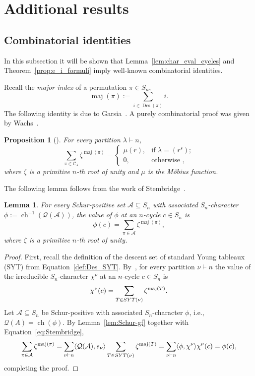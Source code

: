 \documentclass[10pt]{article}
\newtheorem{lemma}[theorem]{Lemma}
\newtheorem{proposition}[theorem]{Proposition}
\theoremstyle{definition}
\newcommand{\Q}{\mathcal Q}
\newcommand{\C}{\mathcal C}
\newcommand{\A}{\mathcal A}
\DeclareMathOperator\Des{Des}
\DeclareMathOperator\maj{maj}
\newcommand{\ch}{{\operatorname{ch}}}
\def\SYT{{\rm SYT}}
\begin{document}
\section{Additional results}
\label{sec:final}

\subsection{Combinatorial identities}
\label{remarks_on_s=1}

In this subsection it will be shown that Lemma~\ref{lem:char_eval_cycles} and Theorem~\ref{prop:e_i_formuli} imply well-known combinatorial identities.

Recall the {\em major index} of a permutation $\pi \in S_n$,
\[
    \maj(\pi):=\sum\limits_{i\in \Des(\pi)}i.
\]
The following identity is due to 
Garsia~\cite{Garsia}. A purely combinatorial proof was given by Wachs~\cite{Wachs}.

\begin{proposition}[{\cite[Equation 5.8]{Garsia}}]\label{prop:Garsia}
     For every partition $\lambda\vdash n$,
    \[
        \sum_{\pi \in \C_\lambda} \zeta^{\maj(\pi)}
        = \begin{cases} 
            \mu(r), &\text{if } \lambda = (r^s); \\
    		0, &\text{otherwise },
		\end{cases}
    \]
    where $\zeta$ is a primitive $n$-th root of unity and $\mu$ is the M\"obius function. 
\end{proposition}

The following lemma follows from the work of Stembridge~\cite{Stembridge}.

\begin{lemma}\label{prop:equiv_Garsia}
    For every Schur-positive set $\A\subseteq S_n$ with associated $S_n$-character $\phi := \ch^{-1}(\Q(\A))$, the value of $\phi$ at an $n$-cycle $c\in S_n$ is
    \[
        \phi(c) = \sum_{\pi \in \A} \zeta^{\maj(\pi)},
    \]
    where $\zeta$ is a primitive $n$-th root of unity. 
\end{lemma}

\begin{proof}
    First, recall 
    the definition of the descent set of standard Young tableaux (SYT) 
    from Equation~\eqref{def:Des_SYT}. By~\cite[Lemma 3.4]{Stembridge}, for every partition $\nu\vdash n$ the value of the irreducible $S_n$-character $\chi^\nu$ at an $n$-cycle $c\in S_n$ is 
    \begin{equation}\label{eq:Stembridge}
        \chi^\nu(c)=\sum\limits_{T\in \SYT(\nu)}\zeta^{\maj(T)}.
    \end{equation}
    Let $\A\subseteq S_n$ be Schur-positive with associated $S_n$-character $\phi$, i.e., 
    $\Q(A)=\ch (\phi)$. 
    By Lemma~\ref{lem:Schur-gf} 
    together with Equation~\eqref{eq:Stembridge},
    \[
        \sum_{\pi \in \A} \zeta^{\maj(\pi)}
        = \sum_{\nu \vdash n} \langle \Q(\A), s_\nu \rangle \sum_{T \in \SYT(\nu)} \zeta^{\maj(T)}
        = \sum_{\nu \vdash n} \langle \phi, \chi^\nu \rangle \chi^\nu(c)
        = \phi(c), 
    \]
    completing the proof.
\end{proof}
\end{document}
